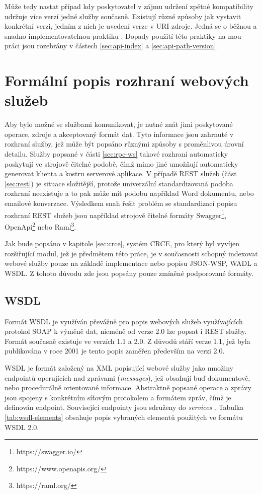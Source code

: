 \documentclass[czech,DP]{thesiskiv}
\begin{document}
Může tedy nastat případ kdy poskytovatel v zájmu udržení zpětné kompatibility udržuje více verzí jedné služby současně. Existují různé způsoby jak vystavit konkrétní verzi, jedním z nich je uvedení verze v URI zdroje. Jedná se o běžnou a snadno implementovatelnou praktiku \cite{restApiVersion}\cite{restfulWebServices}. Dopady použití této praktiky na mou práci jsou rozebrány v částech \ref{sec:api-index} a \ref{sec:api-path-version}.


\section{Formální popis rozhraní webových služeb}
\label{sec:api-description-formats}

Aby bylo možné se službami komunikovat, je nutné znát jimi poskytované operace, zdroje a akceptovaný formát dat. Tyto informace jsou zahrnuté v rozhraní služby, jež může být popsáno různými způsoby s proměnlivou úrovní detailu. Služby popsané v části \ref{sec:rpc-ws} takové rozhraní automaticky poskytují ve strojově čitelné podobě, čímž mimo jiné umožňují automaticky generovat klienta a kostru serverové aplikace. V případě REST služeb (část \ref{sec:rest}) je situace složitější, protože univerzální standardizovaná podoba rozhraní neexistuje a to pak může mít podobu například Word dokumentu, nebo emailové konverzace. Výsledkem snah řešit problém se standardizací popisu rozhraní REST služeb jsou například strojově čitelné formáty Swagger\footnote{https://swagger.io/}, OpenApi\footnote{https://www.openapis.org/} nebo Raml\footnote{https://raml.org/}. 

Jak bude popsáno v kapitole \ref{sec:crce}, systém CRCE, pro který byl vyvíjen rozšiřující modul, jež je předmětem této práce, je v současnosti schopný indexovat webové služby pouze na základě implementace nebo popisu JSON-WSP, WADL a WSDL. Z tohoto důvodu zde jsou popsány pouze zmíněné podporované formáty.

\subsection{WSDL}

Formát WSDL je využíván převážně pro popis webových služeb využívajících protokol SOAP k výměně dat, nicméně od verze 2.0 lze popsat i REST služby. Formát současně existuje ve verzích 1.1 a 2.0. Z důvodů stáří verze 1.1, jež byla publikována v roce 2001 je tento popis zaměřen především na verzi 2.0. 

WSDL je formát založený na XML popisující webové služby jako množiny endpointů operujících nad zprávami (\textit{messages}), jež obsahují buď dokumentově, nebo procedurálně orientované informace. Abstraktně popsané operace a zprávy jsou spojeny s konkrétním síťovým protokolem a formátem zpráv, čímž je definován endpoint. Související endpointy jsou sdruženy do \textit{services} \cite{wsdl2}. Tabulka \ref{tab:wsdl-elements} obsahuje popis vybraných elementů použitých ve formátu WSDL 2.0.
\end{document}
